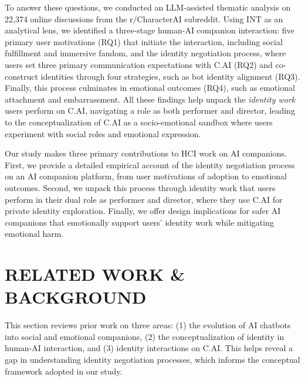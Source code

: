 \documentclass[sigconf, nonacm]{acmart}
\begin{document}

To answer these questions, we conducted an LLM-assisted thematic analysis on 22,374 online discussions from the r/CharacterAI subreddit. Using INT as an analytical lens, we identified a three-stage human-AI companion interaction: five primary user motivations (RQ1) that initiate the interaction, including social fulfillment and immersive fandom, and the identity negotiation process, where users set three primary communication expectations with C.AI (RQ2) and co-construct identities through four strategies, such as bot identity alignment (RQ3). Finally, this process culminates in emotional outcomes (RQ4), such as emotional attachment and embarrassment. All these findings help unpack the \textit{identity work} users perform on C.AI, navigating a role as both performer and director, leading to the conceptualization of C.AI as a socio-emotional sandbox where users experiment with social roles and emotional expression.

Our study makes three primary contributions to HCI work on AI companions. First, we provide a detailed empirical account of the identity negotiation process on an AI companion platform, from user motivations of adoption to emotional outcomes. Second, we unpack this process through identity work that users perform in their dual role as performer and director, where they use C.AI for private identity exploration. Finally, we offer design implications for safer AI companions that emotionally support users' identity work while mitigating emotional harm.


\section{RELATED WORK \& BACKGROUND}
This section reviews prior work on three areas: (1) the evolution of AI chatbots into social and emotional companions, (2) the conceptualization of identity in human-AI interaction, and (3) identity interactions on C.AI. This helps reveal a gap in understanding identity negotiation processes, which informs the conceptual framework adopted in our study.
\end{document}
